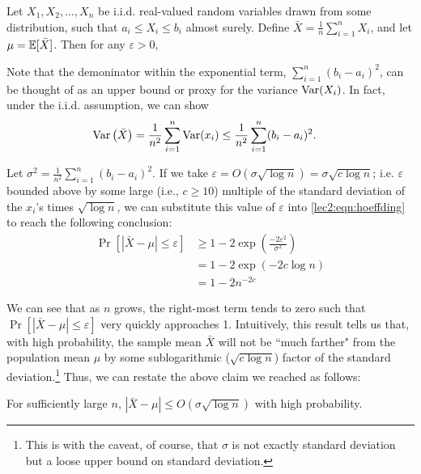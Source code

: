 \begin{theorem}
    Let $X_1, X_2, \dots, X_n$ be i.i.d. real-valued random variables drawn from some distribution, such that $a_i \leq X_i \leq b_i$ almost surely. Define $\bar{X} = \frac{1}{n}\sum_{i=1}^n X_i$, and let $\mu = \mathbb{E} [\bar{X}]$. Then for any $\varepsilon > 0$,
\end{theorem}

Note that the demoninator within the exponential term, $\sum_{i=1}^n (b_i - a_i)^2$, can be thought of as an upper bound or proxy for the variance $\operatorname{Var}(X_i)$. In fact, under the i.i.d. assumption, we can show
\begin{align}
    \operatorname{Var}\left(\bar{X} \right) &= \frac{1}{n^2}\sum_{i=1}^n \operatorname{Var}(x_i) \leq \frac{1}{n^2}\sum_{i=1}^n (b_i - a_i)^2.
\end{align}

Let $\sigma^2 = \frac{1}{n^2}\sum_{i=1}^n (b_i - a_i)^2$. If we take $\varepsilon = O(\sigma \sqrt{\log{n}}) = \sigma \sqrt{c \log n}$; i.e. $\varepsilon$ bounded above by some large (i.e., $c \geq 10$) multiple of the standard deviation of the $x_i$'s times $\sqrt{\log{n}}$, we can substitute this value of $\varepsilon$ into \eqref{lec2:eqn:hoeffding} to reach the following conclusion: 
\begin{align}
    \Pr \left[ |\bar{X} - \mu| \leq \varepsilon \right] &\geq 1 - 2\exp\left(\frac{-2 \varepsilon^2}{\sigma^2}\right)\\
    &= 1 - 2 \exp(-2 c \log n)\\
    &= 1 - 2 n^{-2c}
\end{align}

We can see that as $n$ grows, the right-most term tends to zero such that $\Pr[|\bar{X} - \mu| \leq \varepsilon]$ very quickly approaches 1. Intuitively, this result tells us that, with high probability, the sample mean $\bar{X}$ will not be ``much farther" from the population mean $\mu$ by some sublogarithmic ($\sqrt{c \log n}$) factor of the standard deviation.\footnote{This is with the caveat, of course, that $\sigma$ is not exactly standard deviation but a loose upper bound on standard deviation.} Thus, we can restate the above claim we reached as follows:

\begin{remark}
    For sufficiently large $n$, $|\bar{X} - \mu | \leq O(\sigma \sqrt{\log{n}})$ with high probability.
\end{remark}

